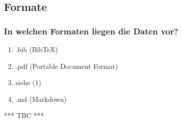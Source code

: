 \goodbreak
\subsection{Formate}

\subsubsection{In welchen Formaten liegen die Daten vor?}

\begin{enumerate}[(1)]
  \item
    .bib (BibTeX)
  \item
    .pdf (Portable Document Format)
  \item
    siehe (1)
  \item
    .md (Markdown)
\end{enumerate}


*** TBC ***


